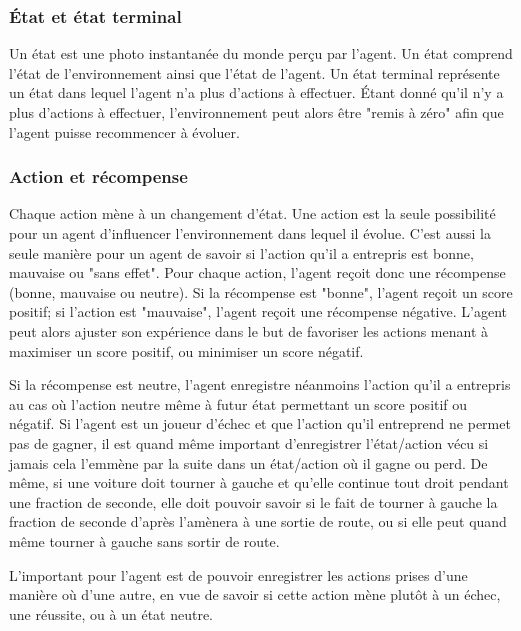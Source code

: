 \documentclass[11pt,a4paper]{report}
\begin{document}
  \subsubsection{État et état terminal}
  
    \par Un état est une photo instantanée du monde perçu par l'agent. Un état comprend l'état de l'environnement ainsi que l'état de l'agent. Un état terminal représente un état dans lequel l'agent n'a plus d'actions à effectuer. Étant donné qu'il n'y a plus d'actions à effectuer, l'environnement peut alors être "remis à zéro" afin que l'agent puisse recommencer à évoluer. 
  
   \subsubsection{Action et récompense}
  
    \par Chaque action mène à un changement d'état. Une action est la seule possibilité pour un agent d'influencer l'environnement dans lequel il évolue. C'est aussi la seule manière pour un agent de savoir si l'action qu'il a entrepris est bonne, mauvaise ou "sans effet". Pour chaque action, l'agent reçoit donc une récompense (bonne, mauvaise ou neutre). Si la récompense est "bonne", l'agent reçoit un score positif; si l'action est "mauvaise", l'agent reçoit une récompense négative. L'agent peut alors ajuster son expérience dans le but de favoriser les actions menant à maximiser un score positif, ou minimiser un score négatif.
    
    \par Si la récompense est neutre, l'agent enregistre néanmoins l'action qu'il a entrepris au cas où l'action neutre même à futur état permettant un score positif ou négatif. Si l'agent est un joueur d'échec et que l'action qu'il entreprend ne permet pas de gagner, il est quand même important d'enregistrer l'état/action vécu si jamais cela l’emmène par la suite dans un état/action où il gagne ou perd. De même, si une voiture doit tourner à gauche et qu'elle continue tout droit pendant une fraction de seconde, elle doit pouvoir savoir si le fait de tourner à gauche la fraction de seconde d'après l'amènera à une sortie de route, ou si elle peut quand même tourner à gauche sans sortir de route. 
    
    \par L'important pour l'agent est de pouvoir enregistrer les actions prises d'une manière où d'une autre, en vue de savoir si cette action mène plutôt à un échec, une réussite, ou à un état neutre. 
    
\end{document}
